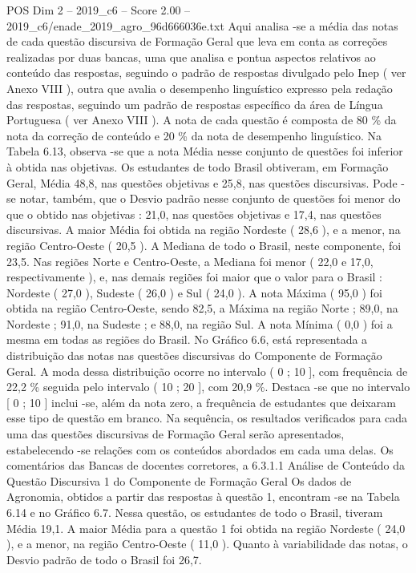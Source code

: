 \begin{textsample}{POS Dim 2 – 2019\_c6 – Score 2.00 – 2019\_c6/enade\_2019\_agro\_96d666036e.txt}
Aqui analisa -se a média das notas de cada questão discursiva de Formação Geral que leva em conta as correções realizadas por duas bancas, uma que analisa e pontua aspectos relativos ao conteúdo das respostas, seguindo o padrão de respostas divulgado pelo Inep ( ver Anexo VIII ), outra que avalia o desempenho linguístico expresso pela redação das respostas, seguindo um padrão de respostas específico da área de Língua Portuguesa ( ver Anexo VIII ).
A nota de cada questão é composta de 80 \% da nota da correção de conteúdo e 20 \% da nota de desempenho linguístico.
Na Tabela 6.13, observa -se que a nota Média nesse conjunto de questões foi inferior à obtida nas objetivas.
Os estudantes de todo Brasil obtiveram, em Formação Geral, Média 48,8, nas questões objetivas e 25,8, nas questões discursivas.
Pode -se notar, também, que o Desvio padrão nesse conjunto de questões foi menor do que o obtido nas objetivas : 21,0, nas questões objetivas e 17,4, nas questões discursivas.
A maior Média foi obtida na região Nordeste ( 28,6 ), e a menor, na região Centro-Oeste ( 20,5 ).
A Mediana de todo o Brasil, neste componente, foi 23,5.
Nas regiões Norte e Centro-Oeste, a Mediana foi menor ( 22,0 e 17,0, respectivamente ), e, nas demais regiões foi maior que o valor para o Brasil : Nordeste ( 27,0 ), Sudeste ( 26,0 ) e Sul ( 24,0 ).
A nota Máxima ( 95,0 ) foi obtida na região Centro-Oeste, sendo 82,5, a Máxima na região Norte ; 89,0, na Nordeste ; 91,0, na Sudeste ; e 88,0, na região Sul.
A nota Mínima ( 0,0 ) foi a mesma em todas as regiões do Brasil.
No Gráfico 6.6, está representada a distribuição das notas nas questões discursivas do Componente de Formação Geral.
A moda dessa distribuição ocorre no intervalo ( 0 ; 10 ], com frequência de 22,2 \% seguida pelo intervalo ( 10 ; 20 ], com 20,9 \%.
Destaca -se que no intervalo [ 0 ; 10 ] inclui -se, além da nota zero, a frequência de estudantes que deixaram esse tipo de questão em branco.
Na sequência, os resultados verificados para cada uma das questões discursivas de Formação Geral serão apresentados, estabelecendo -se relações com os conteúdos abordados em cada uma delas.
Os comentários das Bancas de docentes corretores, a 6.3.1.1 Análise de Conteúdo da Questão Discursiva 1 do Componente de Formação Geral Os dados de Agronomia, obtidos a partir das respostas à questão 1, encontram -se na Tabela 6.14 e no Gráfico 6.7.
Nessa questão, os estudantes de todo o Brasil, tiveram Média 19,1.
A maior Média para a questão 1 foi obtida na região Nordeste ( 24,0 ), e a menor, na região Centro-Oeste ( 11,0 ).
Quanto à variabilidade das notas, o Desvio padrão de todo o Brasil foi 26,7.

\end{textsample}

